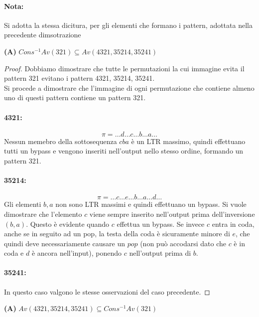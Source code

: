 \paragraph*{Nota:} Si adotta la stessa dicitura, per gli elementi che formano i pattern, adottata nella precedente dimsotrazione
\begin{center}
\textbf{(A)} $Cons^{-1}Av(321) \subseteq Av(4321, 35214, 35241)$
\end{center}
\begin{proof}
Dobbiamo dimostrare che tutte le permutazioni la cui immagine evita il pattern 321 evitano i pattern 4321, 35214, 35241.\\
Si procede a dimostrare che l'immagine di ogni permutazione che contiene almeno uno di questi pattern contiene un pattern 321.
\paragraph*{4321:} $$\pi=\dots{d}\dots{c}\dots{b}\dots{a}\dots$$
Nessun memebro della sottosequenza $cba$ \`e un LTR massimo, quindi effettuano tutti un bypass e vengono inseriti nell'output nello stesso ordine, formando un pattern 321.
\paragraph*{35214:}$$\pi=\dots{c}\dots{e}\dots{b}\dots{a}\dots{d}\dots$$
Gli elementi $b,a$ non sono LTR massimi e quindi effettuano un bypass. 
Si vuole dimostrare che l'elemento $c$ viene sempre inserito nell'output prima dell'inversione $(b,a)$. Questo \`e evidente quando $c$ effettua un bypass. 
Se invece $c$ entra in coda, anche se in seguito ad un pop, la testa della coda \`e sicuramente minore di $e$, 
che quindi deve necessariamente causare un $pop$ 
(non pu\`o accodarsi dato che $c$ \`e in coda e $d$ \`e ancora nell'input), 
ponendo $c$ nell'output prima di $b$.
\paragraph*{35241:} In questo caso valgono le stesse osservazioni del caso precedente.
\end{proof}
\begin{center}
\textbf{(A)} $Av(4321, 35214, 35241) \subseteq Cons^{-1}Av(321)$
\end{center}
